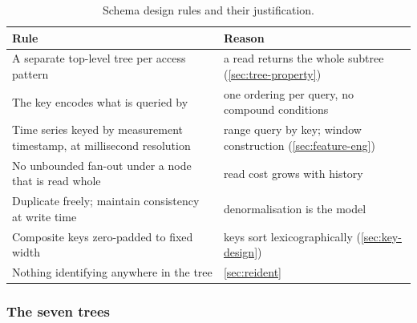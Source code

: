 \documentclass[12pt,a4paper,oneside]{report}
\begin{document}
\begin{table}[htbp]
\centering\small
\caption{Schema design rules and their justification.}\label{tab:schema-rules}
\begin{tabularx}{\textwidth}{@{}>{\raggedright\arraybackslash}p{6.2cm} X@{}}
\toprule
\textbf{Rule} & \textbf{Reason} \\
\midrule
A separate top-level tree per access pattern & a read returns the whole subtree (\cref{sec:tree-property}) \\
The key encodes what is queried by & one ordering per query, no compound conditions \\
Time series keyed by measurement timestamp, at millisecond resolution & range query by key; window construction (\cref{sec:feature-eng}) \\
No unbounded fan-out under a node that is read whole & read cost grows with history \\
Duplicate freely; maintain consistency at write time & denormalisation is the model \\
Composite keys zero-padded to fixed width & keys sort lexicographically (\cref{sec:key-design}) \\
Nothing identifying anywhere in the tree & \cref{sec:reident} \\
\bottomrule
\end{tabularx}
\end{table}

\subsubsection{The seven trees}
\end{document}
